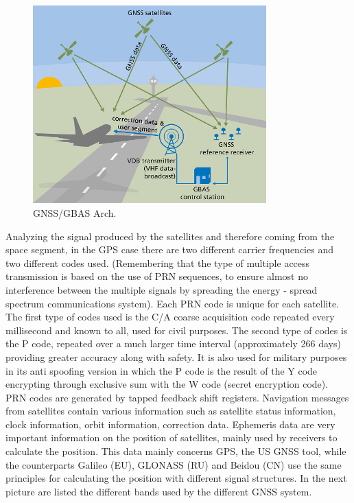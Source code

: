 \documentclass[12pt]{report}
\begin{document}
 \begin{figure}[h!]
    \centering
    \includegraphics[width=9cm]{Pictures/GBAS_GNSS.png}
    \caption{GNSS/GBAS Arch.}
\end{figure}

Analyzing the signal produced by the satellites and therefore coming from the space segment, in the GPS case there are two different carrier frequencies and two different codes used. (Remembering that the type of multiple access transmission is based on the use of PRN sequences, to ensure almost no interference between the multiple signals by spreading the energy - spread spectrum communications system). Each PRN code is unique for each satellite. The first type of codes used is the C/A coarse acquisition code repeated every millisecond and known to all, used for civil purposes. The second type of codes is the P code, repeated over a much larger time interval (approximately 266 days) providing greater accuracy along with safety. It is also used for military purposes in its anti spoofing version in which the P code is the result of the Y code encrypting through exclusive sum with the W code (secret encryption code). PRN codes are generated by tapped feedback shift registers. Navigation messages from satellites contain various information such as satellite status information, clock information, orbit information, correction data. Ephemeris data are very important information on the position of satellites, mainly used by receivers to calculate the position. This data mainly concerns GPS, the US GNSS tool, while the counterparts Galileo (EU), GLONASS (RU) and Beidou (CN) use the same principles for calculating the position with different signal structures.
In the next picture are listed the different bands used by the different GNSS system. 
\end{document}
